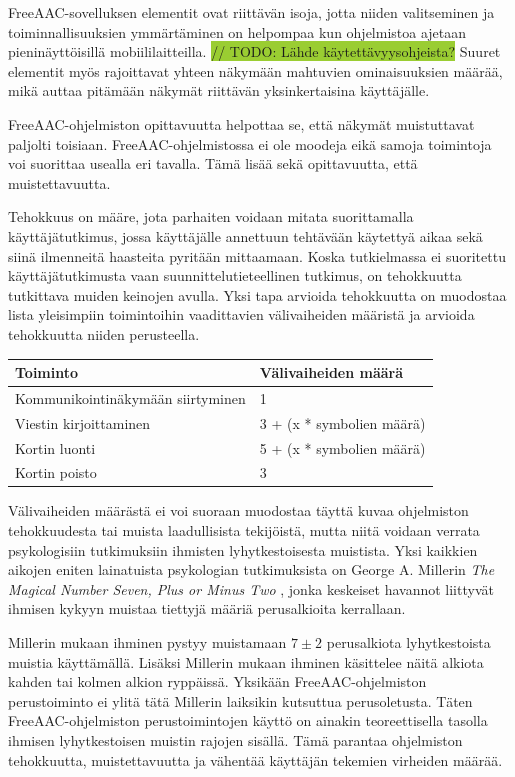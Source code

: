 \documentclass[utf8]{gradu3}
\begin{document}
FreeAAC-sovelluksen elementit ovat riittävän isoja, jotta niiden valitseminen ja toiminnallisuuksien ymmärtäminen on helpompaa kun ohjelmistoa ajetaan pieninäyttöisillä mobiililaitteilla. \colorbox{YellowGreen}{// TODO: Lähde käytettävyysohjeista?} Suuret elementit myös rajoittavat yhteen näkymään mahtuvien ominaisuuksien määrää, mikä auttaa pitämään näkymät riittävän yksinkertaisina käyttäjälle.

FreeAAC-ohjelmiston opittavuutta helpottaa se, että näkymät muistuttavat paljolti toisiaan. FreeAAC-ohjelmistossa ei ole moodeja eikä samoja toimintoja voi suorittaa usealla eri tavalla. Tämä lisää sekä opittavuutta, että muistettavuutta. 

Tehokkuus on määre, jota parhaiten voidaan mitata suorittamalla käyttäjätutkimus, jossa käyttäjälle annettuun tehtävään käytettyä aikaa sekä siinä ilmenneitä haasteita pyritään mittaamaan. Koska tutkielmassa ei suoritettu käyttäjätutkimusta vaan suunnittelutieteellinen tutkimus, on tehokkuutta tutkittava muiden keinojen avulla. Yksi tapa arvioida tehokkuutta on muodostaa lista yleisimpiin toimintoihin vaadittavien välivaiheiden määristä ja arvioida tehokkuutta niiden perusteella.

\begin{center}
    \begin{tabular}{| l | l |}
    \hline
    \textbf{Toiminto} & \textbf{Välivaiheiden määrä} \\ \hline
    Kommunikointinäkymään siirtyminen & 1  \\ \hline
    Viestin kirjoittaminen & 3 + (x * symbolien määrä)\\ \hline
    Kortin luonti & 5 + (x * symbolien määrä) \\ \hline
    Kortin poisto & 3  \\ \hline
    \end{tabular}
\end{center}

Välivaiheiden määrästä ei voi suoraan muodostaa täyttä kuvaa ohjelmiston tehokkuudesta tai muista laadullisista tekijöistä, mutta niitä voidaan verrata psykologisiin tutkimuksiin ihmisten lyhytkestoisesta muistista. Yksi kaikkien aikojen eniten lainatuista psykologian tutkimuksista \parencite[]{most-quoted-psych} on George A. Millerin \textit{The Magical Number Seven, Plus or Minus Two} \parencite[]{magical-number-seven}, jonka keskeiset havannot liittyvät ihmisen kykyyn muistaa tiettyjä määriä perusalkioita kerrallaan.

Millerin mukaan ihminen pystyy muistamaan $7 \pm 2$ perusalkiota lyhytkestoista muistia käyttämällä. Lisäksi Millerin mukaan ihminen käsittelee näitä alkiota kahden tai kolmen alkion ryppäissä. Yksikään FreeAAC-ohjelmiston perustoiminto ei ylitä tätä Millerin laiksikin kutsuttua perusoletusta. Täten FreeAAC-ohjelmiston perustoimintojen käyttö on ainakin teoreettisella tasolla ihmisen lyhytkestoisen muistin rajojen sisällä. Tämä parantaa ohjelmiston tehokkuutta, muistettavuutta ja vähentää käyttäjän tekemien virheiden määrää.
\end{document}
